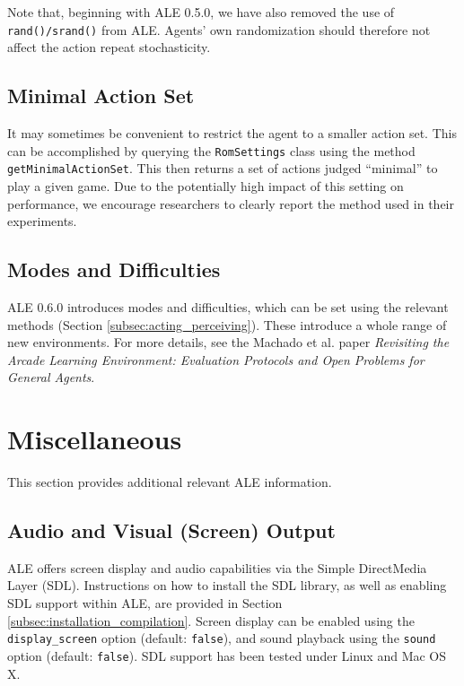 \documentclass[12pt]{article}
\begin{document}
Note that, beginning with ALE 0.5.0, we have also removed the use of \verb+rand()/srand()+ from
ALE. Agents' own randomization should therefore not affect the action repeat stochasticity.

\subsection{Minimal Action Set}

It may sometimes be convenient to restrict the agent to a smaller action set. This can be
accomplished by querying the \verb+RomSettings+ class using the method 
\verb+getMinimalActionSet+. This then returns a set of actions judged ``minimal'' to play a given
game. Due to the potentially high impact of this setting on performance, we encourage researchers
to clearly report the method used in their experiments. 


\subsection{Modes and Difficulties}

ALE 0.6.0 introduces modes and difficulties, which can be set using the relevant methods (Section \ref{subsec:acting_perceiving}). These introduce a whole range of new environments. For more details, see the Machado et al. paper \textit{Revisiting the Arcade Learning Environment: Evaluation Protocols and Open Problems for General Agents}.

\section{Miscellaneous}

This section provides additional relevant ALE information.

\subsection{Audio and Visual (Screen) Output}\label{subsec:displaying_screen}

ALE offers screen display and audio capabilities via the Simple DirectMedia Layer (SDL).
Instructions on how to install the SDL library, as well as enabling SDL support within ALE, are provided in Section \ref{subsec:installation_compilation}. 
Screen display can be enabled using the \verb+display_screen+ option (default: \verb+false+), 
and sound playback using the \verb+sound+ option (default: \verb+false+).
SDL support has been tested under Linux and Mac OS X. 
\end{document}
